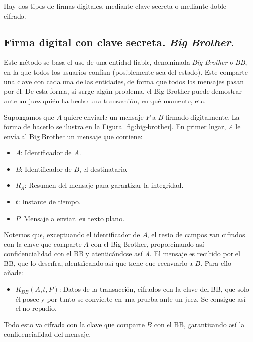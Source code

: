 Hay dos tipos de firmas digitales, mediante clave secreta o mediante doble cifrado.
\subsection{Firma digital con clave secreta. \emph{Big Brother}.}

Este método se basa el uso de una entidad fiable, denominada \emph{Big Brother} o \emph{BB}, en la que todos los usuarios confían (posiblemente sea del estado). Este comparte una clave con cada una de las entidades, de forma que todos los mensajes pasan por él. De esta forma, si surge algún problema, el Big Brother puede demostrar ante un juez quién ha hecho una transacción, en qué momento, etc.

Supongamos que $A$ quiere enviarle un mensaje $P$ a $B$ firmado digitalmente. La forma de hacerlo se ilustra en la Figura~\ref{fig:big-brother}. En primer lugar, $A$ le envía al Big Brother un mensaje que contiene:
\begin{itemize}
    \item {$A$}: Identificador de $A$.
    \item {$B$}: Identificador de $B$, el destinatario.
    \item {$R_A$}: Resumen del mensaje para garantizar la integridad.
    \item {$t$}: Instante de tiempo.
    \item {$P$}: Mensaje a enviar, en texto plano.
\end{itemize}
Notemos que, exceptuando el identificador de $A$, el resto de campos van cifrados con la clave que comparte $A$ con el Big Brother, proporcinando así confidencialidad con el BB y atenticándose así $A$. El mensaje es recibido por el BB, que lo descifra, identificando así que tiene que reenviarlo a $B$. Para ello, añade:
\begin{itemize}
    \item {$K_{BB}(A,t,P)$}: Datos de la transacción, cifrados con la clave del BB, que solo él posee y por tanto se convierte en una prueba ante un juez. Se consigue así el no repudio.
\end{itemize}
Todo esto va cifrado con la clave que comparte $B$ con el BB, garantizando así la confidencialidad del mensaje.
